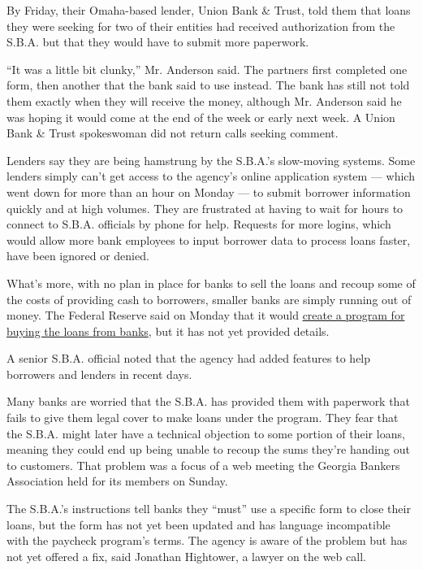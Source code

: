 By Friday, their Omaha-based lender, Union Bank \& Trust, told them that
loans they were seeking for two of their entities had received
authorization from the S.B.A. but that they would have to submit more
paperwork.

``It was a little bit clunky,'' Mr. Anderson said. The partners first
completed one form, then another that the bank said to use instead. The
bank has still not told them exactly when they will receive the money,
although Mr. Anderson said he was hoping it would come at the end of the
week or early next week. A Union Bank \& Trust spokeswoman did not
return calls seeking comment.

Lenders say they are being hamstrung by the S.B.A.'s slow-moving
systems. Some lenders simply can't get access to the agency's online
application system --- which went down for more than an hour on Monday
--- to submit borrower information quickly and at high volumes. They are
frustrated at having to wait for hours to connect to S.B.A. officials by
phone for help. Requests for more logins, which would allow more bank
employees to input borrower data to process loans faster, have been
ignored or denied.

What's more, with no plan in place for banks to sell the loans and
recoup some of the costs of providing cash to borrowers, smaller banks
are simply running out of money. The Federal Reserve said on Monday that
it would
\href{https://www.nytimes3xbfgragh.onion/2020/04/06/business/economy/federal-reserve-small-business-loans.html}{create
a program for buying the loans from banks}, but it has not yet provided
details.

A senior S.B.A. official noted that the agency had added features to
help borrowers and lenders in recent days.

Many banks are worried that the S.B.A. has provided them with paperwork
that fails to give them legal cover to make loans under the program.
They fear that the S.B.A. might later have a technical objection to some
portion of their loans, meaning they could end up being unable to recoup
the sums they're handing out to customers. That problem was a focus of a
web meeting the Georgia Bankers Association held for its members on
Sunday.

The S.B.A.'s instructions tell banks they ``must'' use a specific form
to close their loans, but the form has not yet been updated and has
language incompatible with the paycheck program's terms. The agency is
aware of the problem but has not yet offered a fix, said Jonathan
Hightower, a lawyer on the web call.

